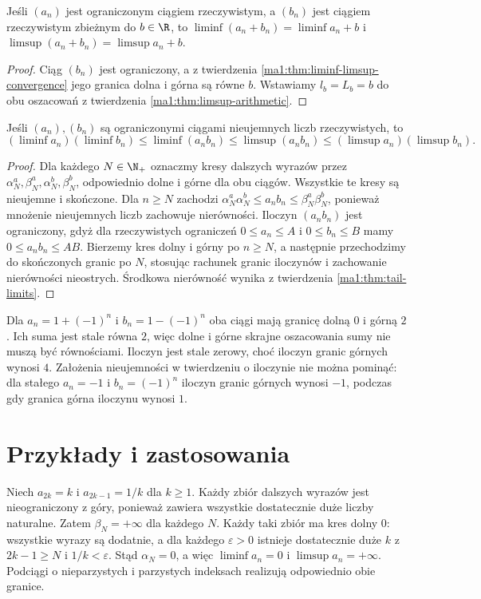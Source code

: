 \begin{wniosek}
\label{ma1:cor:limsup-convergent-summand}
Jeśli $(a_n)$ jest ograniczonym ciągiem rzeczywistym, a $(b_n)$ jest ciągiem rzeczywistym zbieżnym do $b\in\R$, to
$\liminf(a_n+b_n)=\liminf a_n+b$ i
$\limsup(a_n+b_n)=\limsup a_n+b$.
\end{wniosek}
\begin{proof}
Ciąg $(b_n)$ jest ograniczony, a z twierdzenia \ref{ma1:thm:liminf-limsup-convergence} jego granica dolna i górna są równe $b$. Wstawiamy $l_b=L_b=b$ do obu oszacowań z twierdzenia \ref{ma1:thm:limsup-arithmetic}.
\end{proof}

\begin{twierdzenie}
\label{ma1:thm:limsup-products}
Jeśli $(a_n),(b_n)$ są ograniczonymi ciągami nieujemnych liczb rzeczywistych, to
\[
 (\liminf a_n)(\liminf b_n)\le\liminf(a_nb_n)
 \le\limsup(a_nb_n)\le(\limsup a_n)(\limsup b_n).
\]
\end{twierdzenie}
\begin{proof}
Dla każdego $N\in\N_+$ oznaczmy kresy dalszych wyrazów przez $\alpha_N^a,\beta_N^a,\alpha_N^b,\beta_N^b$, odpowiednio dolne i górne dla obu ciągów. Wszystkie te kresy są nieujemne i skończone. Dla $n\ge N$ zachodzi
$\alpha_N^a\alpha_N^b\le a_nb_n\le\beta_N^a\beta_N^b$,
ponieważ mnożenie nieujemnych liczb zachowuje nierówności. Iloczyn $(a_nb_n)$ jest ograniczony, gdyż dla rzeczywistych ograniczeń $0\le a_n\le A$ i $0\le b_n\le B$ mamy $0\le a_nb_n\le AB$. Bierzemy kres dolny i górny po $n\ge N$, a następnie przechodzimy do skończonych granic po $N$, stosując rachunek granic iloczynów i zachowanie nierówności nieostrych. Środkowa nierówność wynika z twierdzenia \ref{ma1:thm:tail-limits}.
\end{proof}
\begin{przyklad}
Dla $a_n=1+(-1)^n$ i $b_n=1-(-1)^n$ oba ciągi mają granicę dolną $0$ i górną $2$. Ich suma jest stale równa $2$, więc dolne i górne skrajne oszacowania sumy nie muszą być równościami. Iloczyn jest stale zerowy, choć iloczyn granic górnych wynosi $4$. Założenia nieujemności w twierdzeniu o iloczynie nie można pominąć: dla stałego $a_n=-1$ i $b_n=(-1)^n$ iloczyn granic górnych wynosi $-1$, podczas gdy granica górna iloczynu wynosi $1$.
\end{przyklad}

\section{Przykłady i zastosowania}
\begin{przyklad}
Niech $a_{2k}=k$ i $a_{2k-1}=1/k$ dla $k\ge1$. Każdy zbiór dalszych wyrazów jest nieograniczony z góry, ponieważ zawiera wszystkie dostatecznie duże liczby naturalne. Zatem $\beta_N=+\infty$ dla każdego $N$. Każdy taki zbiór ma kres dolny $0$: wszystkie wyrazy są dodatnie, a dla każdego $\varepsilon>0$ istnieje dostatecznie duże $k$ z $2k-1\ge N$ i $1/k<\varepsilon$. Stąd $\alpha_N=0$, a więc $\liminf a_n=0$ i $\limsup a_n=+\infty$. Podciągi o nieparzystych i parzystych indeksach realizują odpowiednio obie granice.
\end{przyklad}

